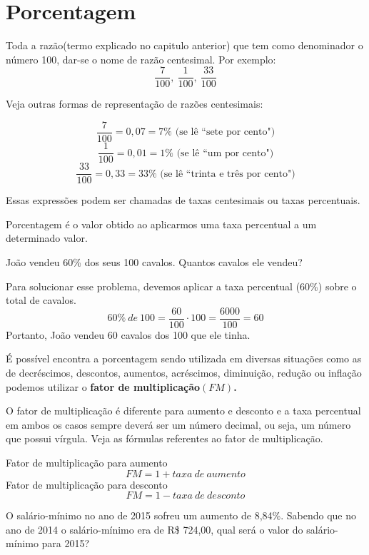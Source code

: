 \section{Porcentagem}
Toda a razão(termo explicado no capitulo anterior) que tem
como denominador o número 100, dar-se o nome de razão centesimal. Por exemplo:
$$\frac{7}{100},~\frac{1}{100},~\frac{33}{100}$$

\noindent Veja outras formas de representação de razões centesimais:

$$\frac{7}{100}=0,07=7\% \textrm{ (se lê ``sete por cento")}$$
$$\frac{1}{100}=0,01=1\%\textrm{ (se lê ``um por cento")} $$
$$\frac{33}{100}=0,33=33\%\textrm{ (se lê ``trinta e três por cento")}$$

\noindent Essas expressões podem ser chamadas de taxas centesimais ou taxas percentuais. 
\begin{definition}
Porcentagem é o valor obtido ao aplicarmos uma taxa percentual a um determinado valor.

\end{definition}
\begin{example}
    João vendeu 60\% dos seus 100 cavalos. Quantos cavalos ele vendeu?
\end{example}
\begin{center}
    Para solucionar esse problema, devemos aplicar a taxa percentual (60\%) sobre o total de cavalos.
    $$60\%~de~100=\frac{60}{100}\cdot100=\frac{6000}{100}=60$$
    Portanto, João vendeu 60 cavalos dos 100 que ele tinha.
\end{center}
É possível encontra a porcentagem sendo utilizada em diversas situações como as de decréscimos, descontos, aumentos, acréscimos, diminuição, redução ou inflação podemos utilizar o \textbf{fator de multiplicação$(FM)$.}

\begin{definition}
O fator de multiplicação é diferente para aumento e desconto e a taxa percentual em ambos os casos sempre deverá ser um número decimal, ou seja, um número que possui vírgula. Veja as fórmulas referentes ao fator de multiplicação.

\end{definition}
\begin{center}
    Fator de multiplicação para aumento
    $$FM=1+taxa~de~aumento$$
    Fator de multiplicação para desconto
    $$FM=1-taxa~de~desconto$$
\end{center}
\begin{example}
    O salário-mínimo no ano de 2015 sofreu um aumento de 8,84\%. Sabendo que no ano de 2014 o salário-mínimo era de R\$ 724,00, qual será o valor do salário-mínimo para 2015?
\end{example}

